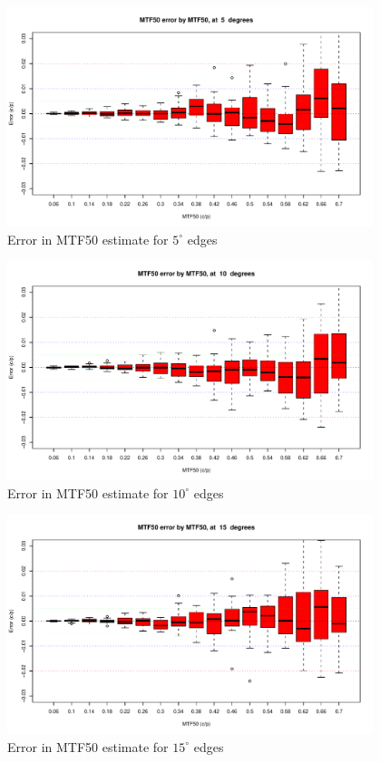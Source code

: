 \documentclass[a4paper]{article}
\begin{document}
\begin{figure}
\centering
\includegraphics[width=0.95\textwidth]{figures/accuracy_plot_a05}
\caption{Error in MTF50 estimate for $5^\circ$ edges}
\label{fig:mtf_accuracy_a5}
\end{figure}

\begin{figure}
\centering
\includegraphics[width=0.95\textwidth]{figures/accuracy_plot_a10}
\caption{Error in MTF50 estimate for $10^\circ$ edges}
\label{fig:mtf_accuracy_a10}
\end{figure}

\begin{figure}
\centering
\includegraphics[width=0.95\textwidth]{figures/accuracy_plot_a15}
\caption{Error in MTF50 estimate for $15^\circ$ edges}
\label{fig:mtf_accuracy_a15}
\end{figure}
\end{document}
